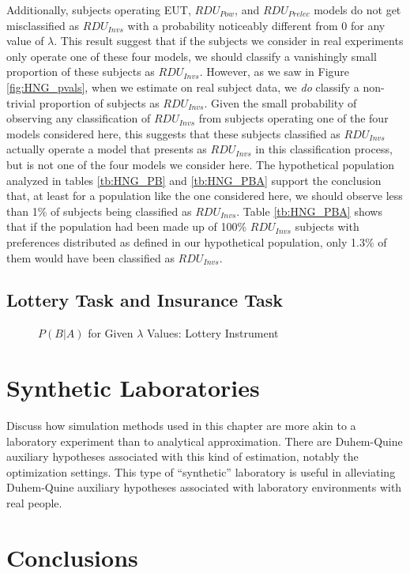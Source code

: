 \documentclass[../main.tex]{subfiles}
\begin{document}
Additionally, subjects operating EUT, $\mathit{RDU_{Pow}}$, and $\mathit{RDU_{Prelec}}$ models do not get misclassified as $\mathit{RDU_{Invs}}$ with a probability noticeably different from 0 for any value of $\lambda$.
This result suggest that if the subjects we consider in real experiments only operate one of these four models, we should classify a vanishingly small proportion of these subjects as $\mathit{RDU_{Invs}}$.
However, as we saw in Figure \ref{fig:HNG_pvals}, when we estimate on real subject data, we \textit{do} classify a non-trivial proportion of subjects as $\mathit{RDU_{Invs}}$.
Given the small probability of observing any classification of $\mathit{RDU_{Invs}}$ from subjects operating one of the four models considered here, this suggests that these subjects classified as $\mathit{RDU_{Invs}}$ actually operate a model that presents as $\mathit{RDU_{Invs}}$ in this classification process, but is not one of the four models we consider here.
The hypothetical population analyzed in tables \ref{tb:HNG_PB} and \ref{tb:HNG_PBA} support the conclusion that, at least for a population like the one considered here, we should observe less than 1\% of subjects being classified as $\mathit{RDU_{Invs}}$.
Table \ref{tb:HNG_PBA} shows that if the population had been made up of 100\% $\mathit{RDU_{Invs}}$ subjects with preferences distributed as defined in our hypothetical population, only 1.3\% of them would have been classified as $\mathit{RDU_{Invs}}$.


\subsection{ \texorpdfstring{\textcite{Hey1994}}{Hey and Orme (1994)} Lottery Task and \texorpdfstring{\textcite{Harrison2016}}{Harrison and Ng (2016)} Insurance Task}
\begin{figure}[h!]
	\center
	\caption{$P(B|A)$ for Given $\lambda$ Values: \textcite{Hey1994} Lottery Instrument}
	\label{fig:HO_mu_winner}
\end{figure}
\section{Synthetic Laboratories}

Discuss how simulation methods used in this chapter are more akin to a laboratory experiment than to analytical approximation.
There are Duhem-Quine auxiliary hypotheses associated with this kind of estimation, notably the optimization settings.
This type of \enquote{synthetic} laboratory is useful in alleviating Duhem-Quine auxiliary hypotheses associated with laboratory environments with real people.

\section{Conclusions}

\onlyinsubfile{
\newpage
\printbibliography[segment=4, heading=subbibliography]
}
\end{document}
